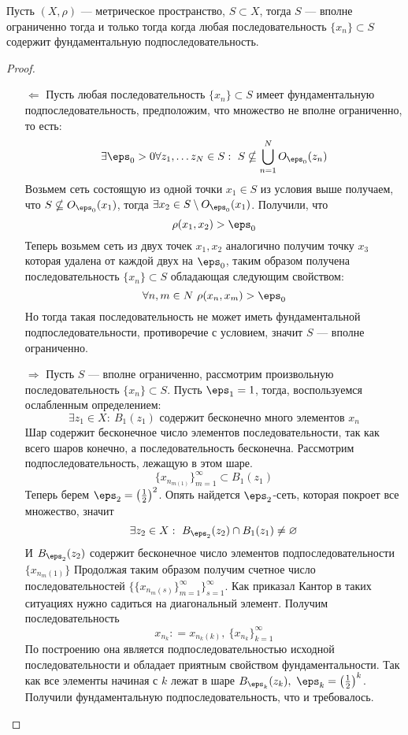 \begin{claim}
	\label{claim:tbc}
	Пусть $(X, \rho)$ --- метрическое пространство, $S \subset X$, тогда $S$ --- вполне ограниченно тогда и только тогда когда любая последовательность $\{x_n\} \subset S$ содержит фундаментальную подпоследовательность.
\end{claim}
\begin{proof}
	\hfil
	\begin{enumerate}
		\item[$\Leftarrow$] Пусть любая последовательность $\{x_n\} \subset S$ имеет фундаментальную подпоследовательность, предположим, что множество не вполне ограниченно, то есть: 
		$$
		\exists \eps_0 > 0 \forall z_1, \dots z_N \in S: \ S \nsubseteq \bigcup_{n=1}^NO_{\eps_0}(z_n)
		$$
		Возьмем сеть состоящую из одной точки $x_1 \in S$ из условия выше получаем, что $S \nsubseteq O_{\eps_0}(x_1)$, тогда $\exists x_2 \in S \setminus O_{\eps_0}(x_1)$. Получили, что 
		$$
		\rho(x_1, x_2) > \eps_0
		$$
		Теперь возьмем сеть из двух точек $x_1, x_2$ аналогично получим точку $x_3$ которая удалена от каждой двух на $\eps_0$, таким образом получена последовательность $\{x_n\} \subset S$ обладающая следующим свойством:
		$$
		\forall n,m \in N \ \rho(x_n, x_m) > \eps_0
		$$
		Но тогда такая последовательность не может иметь фундаментальной подпоследовательности, противоречие с условием, значит $S$ --- вполне ограниченно.
		\item[$\Rightarrow$] Пусть $S$ --- вполне ограниченно, рассмотрим произвольную последовательность $\{x_n\} \subset S$. Пусть $\eps_1 = 1$, тогда, воспользуемся ослабленным определением:
		$$
		\exists z_1 \in X: \ B_1(z_1) \text{ содержит бесконечно много элементов $x_n$}
		$$
		Шар содержит бесконечное число элементов последовательности, так как всего шаров конечно, а последовательность бесконечна. Рассмотрим подпоследовательность, лежащую в этом шаре. 
		$$
		\{x_{n_{m(1)}}\}_{m=1}^\infty \subset B_1(z_1)
		$$ 
		Теперь берем $\eps_2  = \left(\frac{1}{2}\right)^2$. Опять найдется $\eps_2$-сеть, которая покроет все множество, значит
		$$
		\exists z_2 \in X: \ B_{\eps_2}(z_2)\cap B_1(z_1) \neq \varnothing 
		$$
		 И $B_{\eps_2}(z_2)$ содержит бесконечное число элементов подпоследовательности $\{x_{n_m(1)}\}$
		Продолжая таким образом получим счетное число последовательностей $\{\{x_{n_m(s)}\}_{m=1}^\infty\}_{s=1}^\infty$. Как приказал Кантор в таких ситуациях нужно садиться на диагональный элемент. Получим последовательность 
		$$
		x_{n_k} : = x_{n_k(k)}, \ \{x_{n_k}\}_{k=1}^\infty 
		$$
		По построению она является подпоследовательностью исходной последовательности и обладает приятным свойством фундаментальности. Так как все элементы начиная с $k$ лежат в шаре $B_{\eps_k}(z_k), \ \eps_k = \left(\frac{1}{2}\right)^k$. Получили фундаментальную подпоследовательность, что и требовалось.
	\end{enumerate}
\end{proof}
